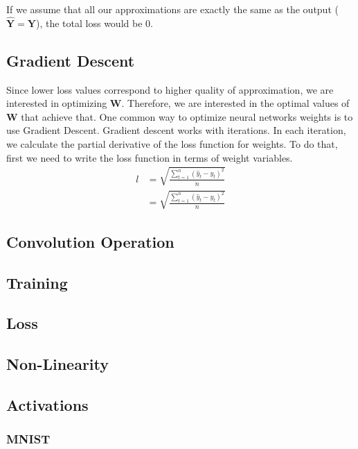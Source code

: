 If we assume that all our approximations are exactly the same as the output ($  \mathbf{\hat Y} =  \mathbf{Y} $), the total loss would be 0. 

\subsection{Gradient Descent}
Since lower loss values correspond to higher quality of approximation, we are interested in optimizing $\mathbf{W}$. Therefore, we are interested in the optimal values of $\mathbf{W}$ that achieve that. 
One common way to optimize neural networks weights is to use Gradient Descent. Gradient descent works with iterations. In each iteration, we calculate the partial derivative of the loss function for weights. To do that, first we need to write the loss function in terms of weight variables.
\begin{equation*}
\begin{split}
l &= \sqrt{\frac{\sum^n_{t=1} (\hat y_t - y_t)^2 }{n}}\\
 &= \sqrt{\frac{\sum^n_{t=1} (\hat y_t - y_t)^2 }{n}}
\end{split}
\end{equation*}


\subsection{Convolution Operation}

\subsection{Training}

\subsection{Loss}

\subsection{Non-Linearity}

\subsection{Activations}

\subsubsection{MNIST}

